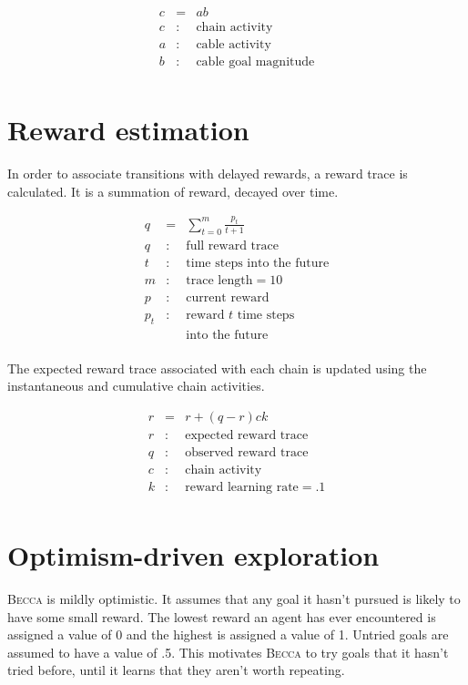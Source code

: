 \documentclass[oneside,twocolumn]{article}
\begin{document}
\begin{eqnarray*}
c &= & ab\\ 
c &:& \mbox{chain activity} \\
a &:& \mbox{cable activity} \\
b &:& \mbox{cable goal magnitude}\\
\end{eqnarray*}

\section*{\color{copper} Reward estimation}

In order to associate transitions with delayed rewards, a reward trace is calculated. It is a summation of reward, decayed over time.

\begin{eqnarray*}
q &= & \sum_{t=0}^m \frac{p_t}{t+1}\\ 
q &:& \mbox{full reward trace} \\
t &:& \mbox{time steps into the future} \\
m &:& \mbox{trace length} = 10\\
p &:& \mbox{current reward}\\
p_t &:& \mbox{reward $t$ time steps}\\
&& \mbox{into the future}\\
\end{eqnarray*}

The expected reward trace associated with each chain is updated using the instantaneous and cumulative chain activities.

\begin{eqnarray*}
r &= & r + (q - r)c k \\ 
r &:& \mbox{expected reward trace} \\
q &:& \mbox{observed reward trace} \\
c &:& \mbox{chain activity} \\
k &:& \mbox{reward learning rate} = .1 \\
\end{eqnarray*}

\section*{\color{copper} Optimism-driven exploration}

\textsc{Becca} is mildly optimistic. It assumes that any goal it hasn't pursued is likely to have some small reward. The lowest reward an agent has ever encountered is assigned a value of 0 and the highest is assigned a value of 1. Untried goals are assumed to have a value of .5. This motivates \textsc{Becca} to try goals that it hasn't tried before, until it learns that they aren't worth repeating.
\end{document}
